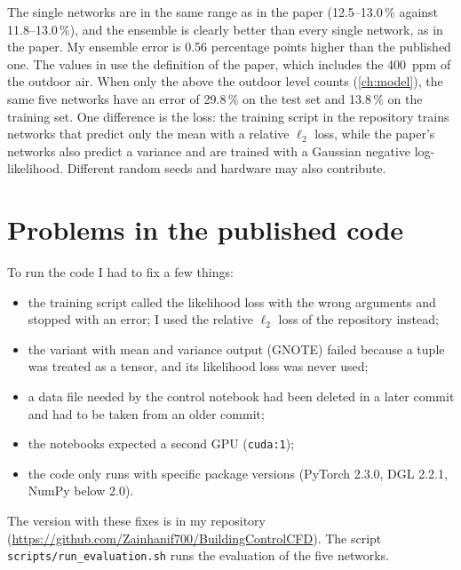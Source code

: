 The single networks are in the same range as in the paper (12.5--13.0\,\% against 11.8--13.0\,\%),
and the ensemble is clearly better than every single network, as in the paper. My ensemble error is
0.56 percentage points higher than the published one. The values in  use the definition of the
paper, which includes the 400~ppm of the outdoor air. When only the \cotwo{} above the outdoor level counts
(\cref{ch:model}), the same five networks have an error of 29.8\,\% on the test set and 13.8\,\% on the
training set. One difference is the loss: the training
script in the repository trains networks that predict only the mean \cotwo{} with a relative
$\ell_2$ loss, while the paper's networks also predict a variance and are trained with a Gaussian
negative log-likelihood. Different random seeds and hardware may also contribute.

\section{Problems in the published code}
To run the code I had to fix a few things:
\begin{itemize}
  \item the training script called the likelihood loss with the wrong arguments and stopped with
        an error; I used the relative $\ell_2$ loss of the repository instead;
  \item the variant with mean and variance output (GNOTE) failed because a tuple was treated as a
        tensor, and its likelihood loss was never used;
  \item a data file needed by the control notebook had been deleted in a later commit and had to be
        taken from an older commit;
  \item the notebooks expected a second GPU (\texttt{cuda:1});
  \item the code only runs with specific package versions (PyTorch 2.3.0, DGL 2.2.1, NumPy below 2.0).
\end{itemize}
The version with these fixes is in my repository
(\url{https://github.com/Zainhanif700/BuildingControlCFD}). The script \texttt{scripts/run\_evaluation.sh}
runs the evaluation of the five networks.
